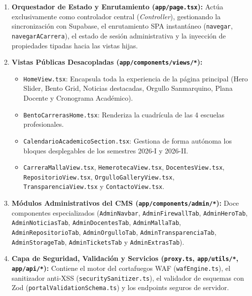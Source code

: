 \documentclass[12pt,a4paper,oneside]{report}
\begin{document}
\begin{enumerate}[label=\textbf{Capa \arabic*:}, leftmargin=1.7cm]
  \item \textbf{Orquestador de Estado y Enrutamiento (\texttt{app/page.tsx}):} Actúa exclusivamente como controlador central (\textit{Controller}), gestionando la sincronización con Supabase, el enrutamiento SPA instantáneo (\texttt{navegar}, \texttt{navegarACarrera}), el estado de sesión administrativa y la inyección de propiedades tipadas hacia las vistas hijas.
  \item \textbf{Vistas Públicas Desacopladas (\texttt{app/components/views/*}):}
    \begin{itemize}[leftmargin=0.6cm]
      \item \texttt{HomeView.tsx}: Encapsula toda la experiencia de la página principal (Hero Slider, Bento Grid, Noticias destacadas, Orgullo Sanmarquino, Plana Docente y Cronograma Académico).
      \item \texttt{BentoCarrerasHome.tsx}: Renderiza la cuadrícula de las 4 escuelas profesionales.
      \item \texttt{CalendarioAcademicoSection.tsx}: Gestiona de forma autónoma los bloques desplegables de los semestres 2026-I y 2026-II.
      \item \texttt{CarreraMallaView.tsx}, \texttt{HemerotecaView.tsx}, \texttt{DocentesView.tsx}, \texttt{RepositorioView.tsx}, \texttt{OrgulloGalleryView.tsx}, \texttt{TransparenciaView.tsx} y \texttt{ContactoView.tsx}.
    \end{itemize}
  \item \textbf{Módulos Administrativos del CMS (\texttt{app/components/admin/*}):} Doce componentes especializados (\texttt{AdminNavbar}, \texttt{AdminFirewallTab}, \texttt{AdminHeroTab}, \texttt{AdminNoticiasTab}, \texttt{AdminDocentesTab}, \texttt{AdminMallaTab}, \texttt{AdminRepositorioTab}, \texttt{AdminOrgulloTab}, \texttt{AdminTransparenciaTab}, \texttt{AdminStorageTab}, \texttt{AdminTicketsTab} y \texttt{AdminExtrasTab}).
  \item \textbf{Capa de Seguridad, Validación y Servicios (\texttt{proxy.ts}, \texttt{app/utils/*}, \texttt{app/api/*}):} Contiene el motor del cortafuegos WAF (\texttt{wafEngine.ts}), el sanitizador anti-XSS (\texttt{securitySanitizer.ts}), el validador de esquemas con Zod (\texttt{portalValidationSchema.ts}) y los endpoints seguros de servidor.
\end{enumerate}
\end{document}
